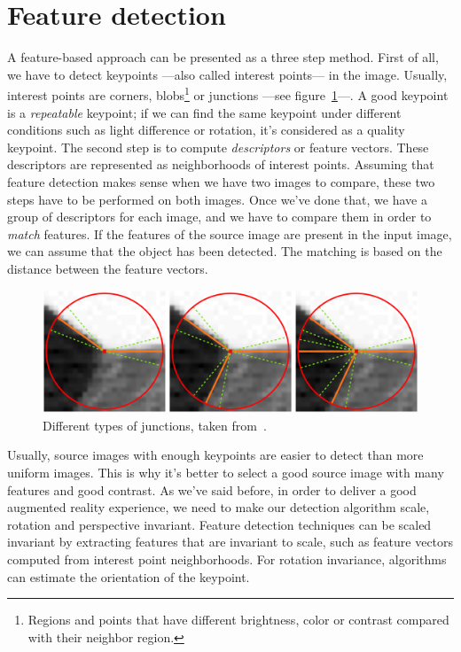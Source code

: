 \section{Feature detection}
A feature-based approach can be presented as a three step method. First of all, we
have to detect keypoints\cite{feature} ---also called interest points--- in the
image. Usually, 
interest points are corners, blobs\footnote{Regions and points that have
  different brightness, color or contrast compared with their neighbor
  region.} or junctions ---see figure~\ref{fig:junctions}---. A good keypoint is a 
\emph{repeatable} keypoint; if we can find the same keypoint under different
conditions such as light difference or rotation, it's considered as a quality
keypoint. The second step is to compute \emph{descriptors} or feature
vectors. These descriptors are represented as neighborhoods of interest
points. Assuming that feature
detection makes sense when we have two images to compare, these two steps have to be
performed on both images. Once we've done that, we have a group of descriptors for
each image, and we have to compare them in order to \emph{match} features. If the
features of the source image are present in the input image, we can assume that the
object has been detected. The matching is based on the distance between the feature
vectors. 

\begin{figure}
\centering
\includegraphics[scale=0.25]{img/junction.png}
\caption{\label{fig:junctions}Different types of junctions, taken
  from~\cite{junction}.} 
\end{figure} 

Usually, source images with enough keypoints are easier to detect than more
uniform images. This is why it's better to select a good source image with many
features and good contrast. 
As we've said before, in order to deliver a good augmented reality experience,
we need to make our detection algorithm scale, rotation and perspective
invariant. Feature detection techniques can be scaled invariant by extracting
features that are invariant to scale, such as feature vectors computed from
interest point neighborhoods. For rotation invariance, algorithms can
estimate the orientation of the keypoint. %

